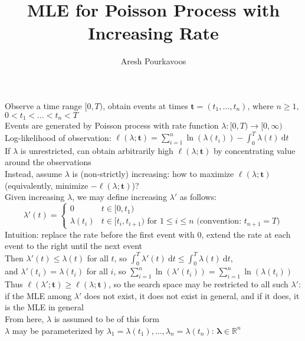 \documentclass{article}
\newcommand{\rparen}{)}
\newcommand{\interval}[2]{\lbrack #1, #2 \rparen}
\begin{document}
\title{MLE for Poisson Process with Increasing Rate}
\author{Aresh Pourkavoos}
\maketitle


Observe a time range $\interval{0}{T}$, obtain events at times $\mathbf{t} = (t_1, \ldots, t_n)$,
where $n \geq 1$, $0 < t_1 < \ldots < t_n < T$ \\
Events are generated by Poisson process with rate function
$\lambda: \interval{0}{T} \rightarrow \interval{0}{\infty}$ \\
Log-likelihood of observation: $\ell(\lambda; \mathbf{t}) = \sum_{i=1}^n \ln(\lambda(t_i)) - \int_0^T\lambda(t)\ \mathrm{d}t$ \\
If $\lambda$ is unrestricted, can obtain arbitrarily high $\ell(\lambda; \mathbf{t})$ by concentrating value around the observations \\
Instead, assume $\lambda$ is (non-strictly) increasing:
how to maximize $\ell(\lambda; \mathbf{t})$ (equivalently, minimize $-\ell(\lambda; \mathbf{t})$)? \\
Given increasing $\lambda$, we may define increasing $\lambda'$ as follows:
\[
\lambda'(t) =
\begin{cases}
  0 & t \in \interval{0}{t_1} \\
  \lambda(t_i) & t \in \interval{t_i}{t_{i+1}} \text{ for } 1 \leq i \leq n \text{ (convention: $t_{n+1} = T$)}
\end{cases}
\]
Intuition: replace the rate before the first event with $0$, extend the rate at each event to the right until the next event \\
Then $\lambda'(t) \leq \lambda(t)$ for all $t$,
so $\int_0^T\lambda'(t)\ \mathrm{d}t \leq \int_0^T\lambda(t)\ \mathrm{d}t$, \\
and $\lambda'(t_i) = \lambda(t_i)$ for all $i$,
so $\sum_{i=1}^n \ln(\lambda'(t_i)) = \sum_{i=1}^n \ln(\lambda(t_i))$ \\
Thus $\ell(\lambda'; \mathbf{t}) \geq \ell(\lambda; \mathbf{t})$,
so the search space may be restricted to all such $\lambda'$: \\
if the MLE among $\lambda'$ does not exist, it does not exist in general,
and if it does, it is the MLE in general \\
From here, $\lambda$ is assumed to be of this form \\
$\lambda$ may be parameterized by $\lambda_1 = \lambda(t_1), \ldots, \lambda_n = \lambda(t_n)$: $\mathbf{\lambda} \in \mathbb{R}^n$ \\
\end{document}
